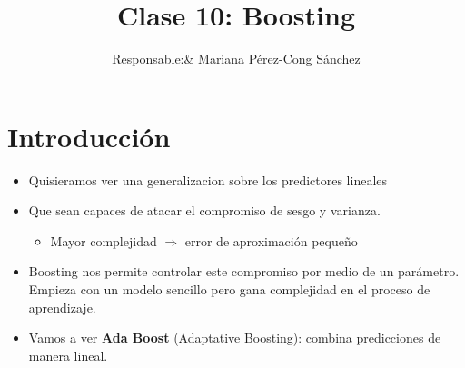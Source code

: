 \documentclass[11pt,reqno,twoside]{article}
\title{Clase 10:               %
    Boosting}	%
\author{%
  Responsable:& Mariana Pérez-Cong Sánchez %
}
\begin{document}
\maketitle 

\section{Introducción}
\label{sec:introduction}
\begin{itemize}
    \item Quisieramos ver una generalizacion sobre los predictores lineales
    \item  Que sean capaces de atacar el compromiso de sesgo y varianza.
    \begin{itemize}
        \item Mayor complejidad $\Rightarrow$ error de aproximación pequeño
        
    \end{itemize}
    \item Boosting nos permite controlar este compromiso por medio de un parámetro. Empieza con un modelo sencillo pero gana complejidad en el proceso de aprendizaje.
    \item Vamos a ver \textbf{Ada Boost} (Adaptative Boosting): combina predicciones de manera lineal.
    
\end{itemize}
\end{document}
